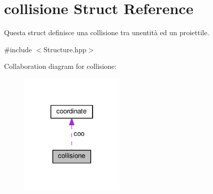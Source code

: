 \hypertarget{structcollisione}{}\section{collisione Struct Reference}
\label{structcollisione}


Questa struct definisce una collisione tra un\textquotesingle{}entità ed un proiettile.  




{\ttfamily \#include $<$Structure.\+hpp$>$}



Collaboration diagram for collisione\+:\nopagebreak
\begin{figure}[H]
\begin{center}
\leavevmode
\includegraphics[width=142pt]{structcollisione__coll__graph}
\end{center}
\end{figure}
